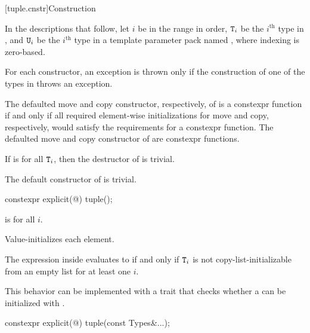 \documentclass{wg21}
\begin{document}
[tuple.cnstr]{Construction}

\pnum
In the descriptions that follow, let $i$ be in the range
 in order, $\texttt{T}_i$
be the $i^\text{th}$ type in , and
$\texttt{U}_i$ be the $i^\text{th}$ type in a template parameter pack named , where indexing
is zero-based.

\pnum
For each  constructor, an exception is thrown only if the construction of
one of the types in  throws an exception.

\pnum
The defaulted move and copy constructor, respectively, of
 is a constexpr function if and only if all
required element-wise initializations for move and copy, respectively,
would satisfy the requirements for a constexpr function. The
defaulted move and copy constructor of  are
constexpr functions.

\pnum
If  is  for all $\texttt{T}_i$,
then the destructor of  is trivial.

\pnum
The default constructor of  is trivial.

%
\begin{itemdecl}
    constexpr explicit(@\seebelow@) tuple();
\end{itemdecl}

\begin{itemdescr}
    \pnum
    \constraints
     is  for all $i$.
    
    \pnum
    \effects
    Value-initializes each element.
    
    \pnum
    \remarks
    The expression inside  evaluates to 
    if and only if $\texttt{T}_i$ is not
    copy-list-initializable from an empty list
    for at least one $i$.
    \begin{note}
        This behavior can be implemented with a trait that checks whether
        a  can be initialized with \tcode{\{\}}.
    \end{note}
\end{itemdescr}

%
\begin{itemdecl}
    constexpr explicit(@\seebelow@) tuple(const Types&...);
\end{itemdecl}
\end{document}
